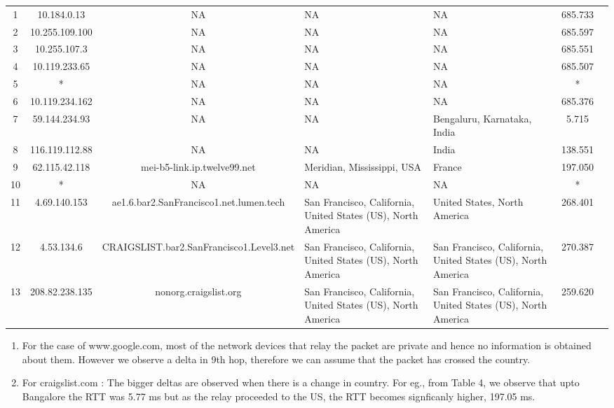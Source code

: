 \documentclass[12pt]{article}
\begin{document}
\begin{enumerate}
\begin{table}[h!]
{\begin{tabular}{|c|c|c| >{\centering\arraybackslash}m{} | >{\centering\arraybackslash}m{} |c|c|}
            \hline
            1 & 10.184.0.13 & NA & NA & NA & 685.733 \\
            2 & 10.255.109.100 & NA & NA & NA & 685.597 \\
            3 & 10.255.107.3 & NA & NA & NA & 685.551 \\
            4 & 10.119.233.65 & NA & NA & NA & 685.507 \\
            5 & * & NA & NA & NA & * \\
            6 & 10.119.234.162 & NA & NA & NA & 685.376 \\
            7 & 59.144.234.93 & NA & NA & Bengaluru, Karnataka, India & 5.715 \\
            8 & 116.119.112.88 & NA & NA & India & 138.551 \\
            9 & 62.115.42.118 & mei-b5-link.ip.twelve99.net & Meridian, Mississippi, USA & France & 197.050 \\
            10 & * & NA & NA & NA & * \\
            11 & 4.69.140.153 & ae1.6.bar2.SanFrancisco1.net.lumen.tech & San Francisco, California, United States (US), North America & United States, North America & 268.401 \\
            12 & 4.53.134.6 & CRAIGSLIST.bar2.SanFrancisco1.Level3.net & San Francisco, California, United States (US), North America & San Francisco, California, United States (US), North America & 270.387 \\
            13 & 208.82.238.135 & nonorg.craigslist.org & San Francisco, California, United States (US), North America & San Francisco, California, United States (US), North America & 259.620 \\
            \hline
        \end{tabular}}
    \end{table}

    \begin{enumerate}
        \item For the case of www.google.com, most of the network devices that relay the packet are private and hence no information is obtained about them. However we observe a delta in 9th hop, therefore we can assume that the packet has crossed the country.
        \item For craigslist.com : The bigger deltas are observed when there is a change in country. For eg., from Table 4, we observe that upto Bangalore the RTT was 5.77 ms but as the relay proceeded to the US, the RTT becomes signficanly higher, 197.05 ms. 
    \end{enumerate}


\end{enumerate}
\end{document}

